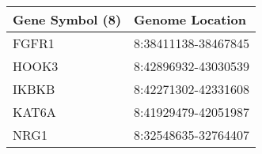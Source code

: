 \begin{tabular}{ll}
\toprule
Gene Symbol (8) &     Genome Location \\
\midrule
          FGFR1 & 8:38411138-38467845 \\
          HOOK3 & 8:42896932-43030539 \\
          IKBKB & 8:42271302-42331608 \\
          KAT6A & 8:41929479-42051987 \\
           NRG1 & 8:32548635-32764407 \\
\bottomrule
\end{tabular}
